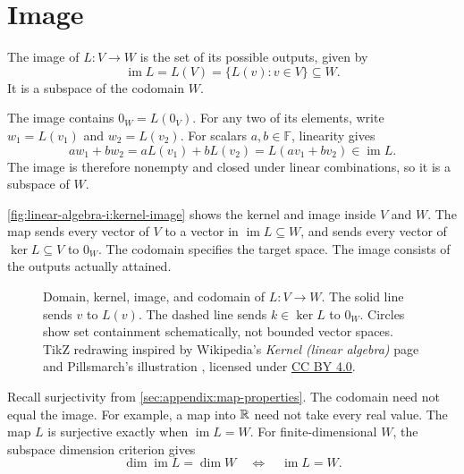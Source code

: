 \section{Image}
\label{sec:linear-algebra-i:image}

\begin{definition}
  The image of \(L:V\to W\) is the set of its possible outputs, given by
  \[
    \operatorname{im}L=L(V)=\{L(v):v\in V\}\subseteq W.
  \]
  It is a subspace of the codomain \(W\).
\end{definition}

\begin{pendingreview}
The image contains \(0_W=L(0_V)\). For any two of its elements,
write \(w_1=L(v_1)\) and \(w_2=L(v_2)\). For scalars
\(a,b\in\mathbb F\), linearity gives
\[
  aw_1+bw_2=aL(v_1)+bL(v_2)=L(av_1+bv_2)\in\operatorname{im}L.
\]
The image is therefore nonempty and closed under linear combinations,
so it is a subspace of \(W\).
\end{pendingreview}

\autoref{fig:linear-algebra-i:kernel-image} shows the kernel and image
inside \(V\) and \(W\). The map sends every vector of \(V\)
to a vector in \(\operatorname{im}L\subseteq W\), and sends every vector
of \(\ker L\subseteq V\) to \(0_W\). The codomain specifies the target
space. The image consists of the outputs actually attained.

\begin{figure}[htbp]
  \centering
  
  \caption[Kernel and image of a linear map]{Domain, kernel, image, and codomain of \(L:V\to W\).
    The solid line sends \(v\) to \(L(v)\). The dashed line sends
    \(k\in\ker L\) to \(0_W\). Circles show set containment
    schematically, not bounded vector spaces. TikZ redrawing inspired by
    Wikipedia's \emph{Kernel (linear algebra)} page
    \cite{WikipediaKernel} and Pillsmarch's illustration
    \cite{PillsmarchKernelImage},
    licensed under \href{https://creativecommons.org/licenses/by/4.0/}{CC BY 4.0}.}
  \label{fig:linear-algebra-i:kernel-image}
\end{figure}

Recall surjectivity from \autoref{sec:appendix:map-properties}.
The codomain need not equal the image. For example, a map into \(\mathbb{R}\)
need not take every real value. The map \(L\) is surjective exactly when
\(\operatorname{im}L=W\). For finite-dimensional \(W\), the subspace
dimension criterion gives
\[
  \dim\operatorname{im}L=\dim W
    \quad\Longleftrightarrow\quad
  \operatorname{im}L=W.
\]

